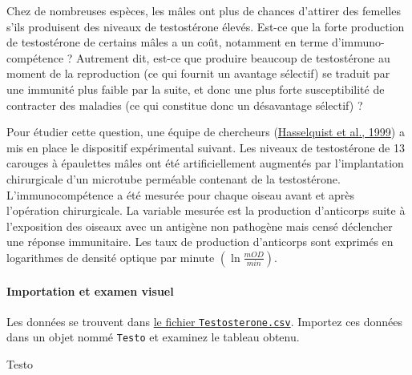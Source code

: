 \documentclass[
  a4paper,
]{article}
\newenvironment{Shaded}{\begin{snugshade}}{\end{snugshade}}
\newcommand{\NormalTok}[1]{\textcolor[rgb]{0.12,0.11,0.11}{#1}}
\begin{document}
Chez de nombreuses espèces, les mâles ont plus de chances d'attirer des femelles s'ils produisent des niveaux de testostérone élevés. Est-ce que la forte production de testostérone de certains mâles a un coût, notamment en terme d'immuno-compétence ? Autrement dit, est-ce que produire beaucoup de testostérone au moment de la reproduction (ce qui fournit un avantage sélectif) se traduit par une immunité plus faible par la suite, et donc une plus forte susceptibilité de contracter des maladies (ce qui constitue donc un désavantage sélectif) ?

Pour étudier cette question, une équipe de chercheurs (\protect\hyperlink{ref-Hasselquist1999}{Hasselquist et al., 1999}) a mis en place le dispositif expérimental suivant. Les niveaux de testostérone de 13 carouges à épaulettes mâles ont été artificiellement augmentés par l'implantation chirurgicale d'un microtube perméable contenant de la testostérone. L'immunocompétence a été mesurée pour chaque oiseau avant et après l'opération chirurgicale. La variable mesurée est la production d'anticorps suite à l'exposition des oiseaux avec un antigène non pathogène mais censé déclencher une réponse immunitaire. Les taux de production d'anticorps sont exprimés en logarithmes de densité optique par minute \(\left(\ln\frac{mOD}{min}\right)\).

\hypertarget{importation-et-examen-visuel-1}{%
\paragraph{Importation et examen visuel}\label{importation-et-examen-visuel-1}}

Les données se trouvent dans \href{https://besibo.github.io/Biometrie3/data/Testosterone.csv}{le fichier \texttt{Testosterone.csv}}. Importez ces données dans un objet nommé \texttt{Testo} et examinez le tableau obtenu.

\begin{Shaded}
\begin{Highlighting}[]
\NormalTok{Testo}
\end{Highlighting}
\end{Shaded}
\end{document}
